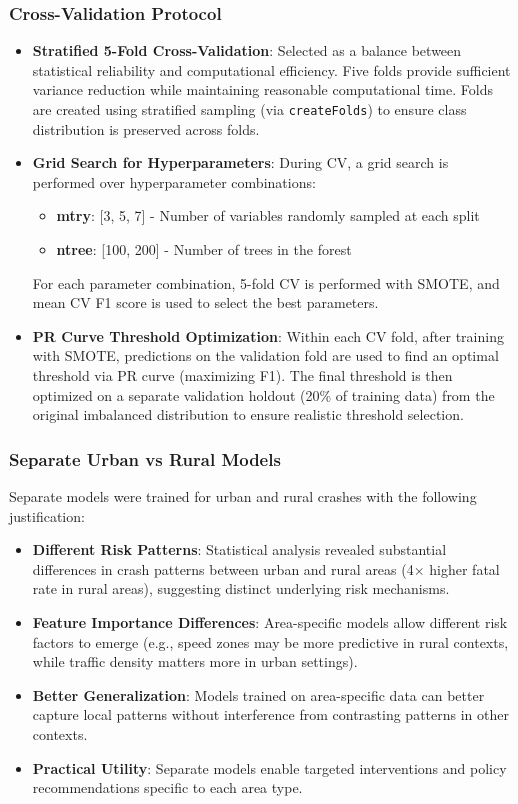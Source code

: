 \documentclass[12pt,a4paper]{article}
\begin{document}
\subsubsection{Cross-Validation Protocol}
\begin{itemize}
    \item \textbf{Stratified 5-Fold Cross-Validation}: Selected as a balance between statistical reliability and computational efficiency. Five folds provide sufficient variance reduction while maintaining reasonable computational time. Folds are created using stratified sampling (via \texttt{createFolds}) to ensure class distribution is preserved across folds.
    \item \textbf{Grid Search for Hyperparameters}: During CV, a grid search is performed over hyperparameter combinations:
    \begin{itemize}
        \item \textbf{mtry}: [3, 5, 7] - Number of variables randomly sampled at each split
        \item \textbf{ntree}: [100, 200] - Number of trees in the forest
    \end{itemize}
    For each parameter combination, 5-fold CV is performed with SMOTE, and mean CV F1 score is used to select the best parameters.
    \item \textbf{PR Curve Threshold Optimization}: Within each CV fold, after training with SMOTE, predictions on the validation fold are used to find an optimal threshold via PR curve (maximizing F1). The final threshold is then optimized on a separate validation holdout (20\% of training data) from the original imbalanced distribution to ensure realistic threshold selection.
\end{itemize}

\subsubsection{Separate Urban vs Rural Models}
Separate models were trained for urban and rural crashes with the following justification:
\begin{itemize}
    \item \textbf{Different Risk Patterns}: Statistical analysis revealed substantial differences in crash patterns between urban and rural areas (4$\times$ higher fatal rate in rural areas), suggesting distinct underlying risk mechanisms.
    \item \textbf{Feature Importance Differences}: Area-specific models allow different risk factors to emerge (e.g., speed zones may be more predictive in rural contexts, while traffic density matters more in urban settings).
    \item \textbf{Better Generalization}: Models trained on area-specific data can better capture local patterns without interference from contrasting patterns in other contexts.
    \item \textbf{Practical Utility}: Separate models enable targeted interventions and policy recommendations specific to each area type.
\end{itemize}
\end{document}
